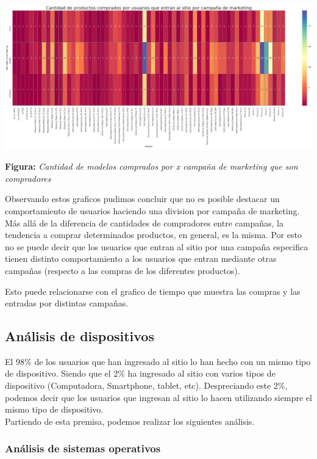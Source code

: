 \documentclass[titlepage,a4paper]{article}
\begin{document}
  \begin{center}
   \includegraphics[width=16cm, height=7cm]{modelosCamp3.png}\\
	\textbf{Figura:}  \textit{Cantidad de modelos comprados por \textit{x} campaña de marketing que son compradores}
	\end{center}	
	
	
Observando estos graficos pudimos concluir que no es posible destacar un comportamiento de usuarios haciendo una division por campaña de marketing. Más allá de la diferencia de cantidades de compradores entre campañas, la tendencia a comprar determinados productos, en general, es la misma. Por esto no se puede decir que los usuarios que entran al sitio por una campaña especifica tienen distinto comportamiento a los usuarios que entran mediante otras campañas (respecto a las compras de los diferentes productos).

Esto puede relacionarse con el grafico de tiempo que muestra las compras y las entradas por distintas campañas.
	
	
	\subsection{Análisis de dispositivos}
	El 98\% de los usuarios que han ingresado al sitio lo han hecho con un mismo tipo de dispositivo. Siendo que el 2\% ha ingresado al sitio con varios tipos de dispositivo (Computadora, Smartphone, tablet, etc). Despreciando este 2\%, podemos decir que los usuarios que ingresan al sitio lo hacen utilizando siempre el mismo tipo de dispositivo. \\
	
	Partiendo de esta premisa, podemos realizar los siguientes análisis.
	
	\subsubsection{Análisis de sistemas operativos}
	
\end{document}
